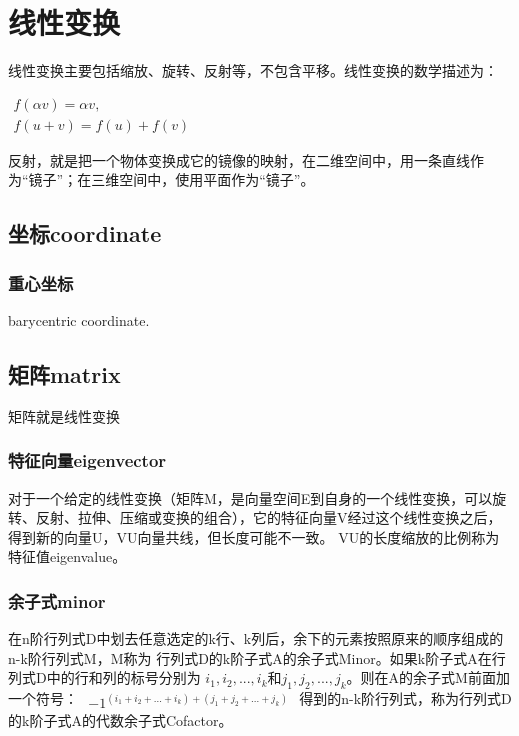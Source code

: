 \clearpage
\section{线性变换}


线性变换主要包括缩放、旋转、反射等，不包含平移。线性变换的数学描述为：

\begin{math}
\begin{aligned}
f(\alpha v)=\alpha v, \\
f(u+v)=f(u)+f(v)
\end{aligned}
\end{math}

反射，就是把一个物体变换成它的镜像的映射，在二维空间中，用一条直线作为“镜子”；在三维空间中，使用平面作为“镜子”。

\subsection{ 坐标coordinate}

\subsubsection{重心坐标}
barycentric coordinate.


\subsection{ 矩阵matrix }
矩阵就是线性变换
\subsubsection{特征向量eigenvector}
对于一个给定的线性变换（矩阵M，是向量空间E到自身的一个线性变换，可以旋转、反射、拉伸、压缩或变换的组合），它的特征向量V经过这个线性变换之后，得到新的向量U，VU向量共线，但长度可能不一致。
VU的长度缩放的比例称为特征值eigenvalue。

\subsubsection{余子式minor}
在n阶行列式D中划去任意选定的k行、k列后，余下的元素按照原来的顺序组成的n-k阶行列式M，M称为
行列式D的k阶子式A的余子式Minor。如果k阶子式A在行列式D中的行和列的标号分别为
$i_{1},i_{2},...,i_{k}$和$j_{1},j_{2},...,j_{k}$。则在A的余子式M前面加一个符号：
\begin{math}
    \begin{aligned}
        {-1}^{(i_{1}+i_{2}+...+i_{k}) + (j_{1}+j_{2}+...+j_{k})}
    \end{aligned}
\end{math}
得到的n-k阶行列式，称为行列式D的k阶子式A的代数余子式Cofactor。

